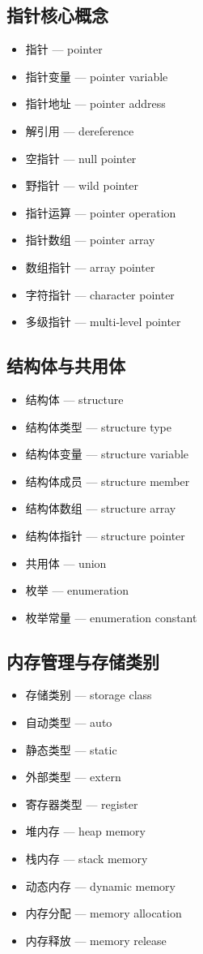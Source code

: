 \subsection{指针核心概念}
\begin{itemize}
\item 指针 — pointer
\item 指针变量 — pointer variable
\item 指针地址 — pointer address
\item 解引用 — dereference
\item 空指针 — null pointer
\item 野指针 — wild pointer
\item 指针运算 — pointer operation
\item 指针数组 — pointer array
\item 数组指针 — array pointer
\item 字符指针 — character pointer
\item 多级指针 — multi-level pointer
\end{itemize}

\subsection{结构体与共用体}
\begin{itemize}
\item 结构体 — structure
\item 结构体类型 — structure type
\item 结构体变量 — structure variable
\item 结构体成员 — structure member
\item 结构体数组 — structure array
\item 结构体指针 — structure pointer
\item 共用体 — union
\item 枚举 — enumeration
\item 枚举常量 — enumeration constant
\end{itemize}

\subsection{内存管理与存储类别}
\begin{itemize}
\item 存储类别 — storage class
\item 自动类型 — auto
\item 静态类型 — static
\item 外部类型 — extern
\item 寄存器类型 — register
\item 堆内存 — heap memory
\item 栈内存 — stack memory
\item 动态内存 — dynamic memory
\item 内存分配 — memory allocation
\item 内存释放 — memory release
\end{itemize}

